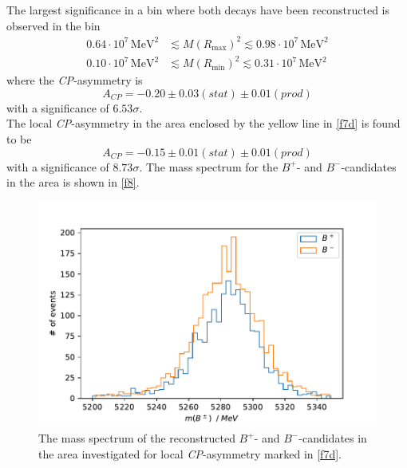The largest significance in a bin where both decays have been reconstructed is observed in the bin
\begin{align*}
  0.64 \cdot 10^{7} \, \si{\mega\eV\squared} &\lesssim M(R_\text{max})^2 \lesssim 0.98\cdot 10^{7} \, \si{\mega\eV\squared} \\
  0.10 \cdot 10^{7} \, \si{\mega\eV\squared} &\lesssim M(R_\text{min})^2 \lesssim 0.31 \cdot 10^{7} \, \si{\mega\eV\squared}
\end{align*}
where the \textit{CP}-asymmetry is
\begin{equation}
  A_\textit{CP} = -0.20 \pm 0.03(stat)  \pm 0.01(prod)
\end{equation}
with a significance of $6.53 \sigma$. \\
The local \textit{CP}-asymmetry in the area enclosed by the yellow line in \autoref{f7d} is found to be
\begin{equation}
  A_\textit{CP} = -0.15  \pm 0.01  (stat)  \pm 0.01(prod)
\end{equation}
with a significance of $8.73 \sigma$. The mass spectrum for the $B^+$- and $B^-$-candidates in the area is shown in \autoref{f8}.

\begin{figure}[H]
  \centering
    \includegraphics[width=\textwidth]{plots/num_b.pdf}
  \caption{The mass spectrum of the reconstructed $B^+$- and $B^-$-candidates in the area investigated for local \textit{CP}-asymmetry marked in \autoref{f7d}.}
  \label{f8}
\end{figure}
